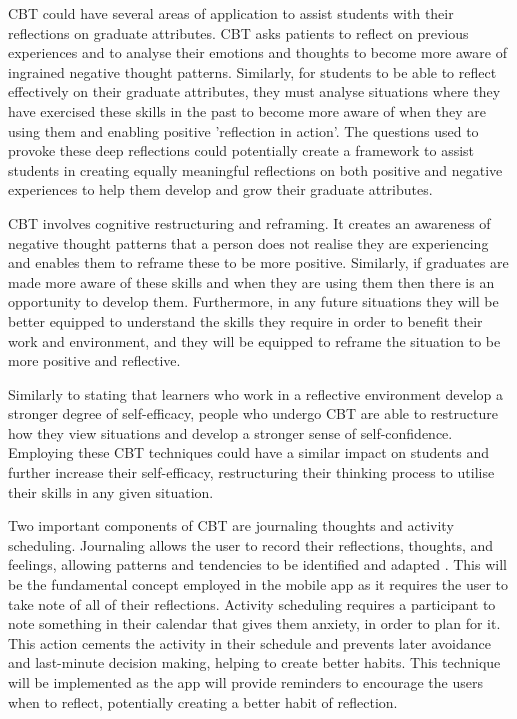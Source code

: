 \documentclass{l4proj}
\begin{document}
CBT could have several areas of application to assist students with their reflections on graduate attributes. CBT asks patients to reflect on previous experiences and to analyse their emotions and thoughts to become more aware of ingrained negative thought patterns. Similarly, for students to be able to reflect effectively on their graduate attributes, they must analyse situations where they have exercised these skills in the past to become more aware of when they are using them and enabling positive 'reflection in action'. The questions used to provoke these deep reflections could potentially create a framework to assist students in creating equally meaningful reflections on both positive and negative experiences to help them develop and grow their graduate attributes.

CBT involves cognitive restructuring and reframing. It creates an awareness of negative thought patterns that a person does not realise they are experiencing and enables them to reframe these to be more positive. Similarly, if graduates are made more aware of these skills and when they are using them then there is an opportunity to develop them. Furthermore, in any future situations they will be better equipped to understand the skills they require in order to benefit their work and environment, and they will be equipped to reframe the situation to be more positive and reflective.

Similarly to \citet{bruno_reflective_2018} stating that learners who work in a reflective environment develop a stronger degree of self-efficacy, people who undergo CBT are able to restructure how they view situations and develop a stronger sense of self-confidence. Employing these CBT techniques could have a similar impact on students and further increase their self-efficacy, restructuring their thinking process to utilise their skills in any given situation. 

Two important components of CBT are journaling thoughts and activity scheduling. Journaling allows the user to record their reflections, thoughts, and feelings, allowing patterns and tendencies to be identified and adapted \citep{ackerman_cbt_2017}. This will be the fundamental concept employed in the mobile app as it requires the user to take note of all of their reflections. Activity scheduling requires a participant to note something in their calendar that gives them anxiety, in order to plan for it. This action cements the activity in their schedule and prevents later avoidance and last-minute decision making, helping to create better habits. This technique will be implemented as the app will provide reminders to encourage the users when to reflect, potentially creating a better habit of reflection.
\end{document}
